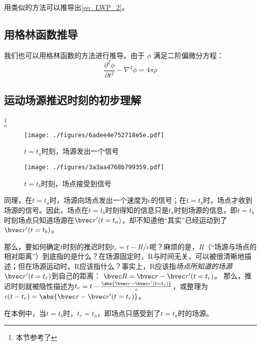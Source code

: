 用类似的方法可以推导出\autoref{eq_LWP_2}。

\subsection{用格林函数推导}
我们也可以用格林函数的方法进行推导。由于 $\phi$ 满足二阶偏微分方程：
\begin{equation}
\frac{\partial^2 \phi}{\partial t^2}-\nabla^2 \phi= 4\pi \rho
\end{equation}

\subsection{运动场源推迟时刻的初步理解}
\footnote{本节参考了\cite{GriffE}}
\begin{figure}[ht]
\centering
\texttt{[image: ./figures/6adee4e752718e5e.pdf]}
\caption{$t=t_a$时刻，场源发出一个信号} \label{fig_LWP_1}
\end{figure}
\begin{figure}[ht]
\centering
\texttt{[image: ./figures/3a3aa4768b799359.pdf]}
\caption{$t=t_b$时刻，场点接受到信号} \label{fig_LWP_2}
\end{figure}
同理，在$t=t_a$时，场源向场点发出一个速度为c的信号；在$t=t_b$时，场点才收到场源的信号。因此，场点在$t=t_b$时刻得知的信息只是$t_a$时刻场源的信息，即$t=t_b$时刻场点只知道场源在$\bvec r'(t=t_a)$，却不知道他“其实”已经运动到了$\bvec r'(t=t_b)$。

那么，要如何确定$t$时刻的推迟时刻$t_r=t-R/c$呢？麻烦的是，$R$（“场源与场点的相对距离”）到底指的是什么？在场源固定时，R与时间无关，可以被很清晰地描述；但在场源运动时，R应该指什么？事实上，R应该指\textsl{场点所知道的场源}$\bvec r'(t=t_r)$到自己的距离： $\bvec R = \bvec r - \bvec r'(t=t_r)$。
那么，推迟时刻就被隐性描述为$t_r=t-\frac{\abs{\bvec r - \bvec r'(t=t_r)}}{c}$，或整理为$c(t-t_r)=\abs{\bvec r - \bvec r'(t=t_r)}$。

在本例中，当$t=t_b$时，$t_r=t_a$，即场点只感受到了$t=t_a$时的场源。
